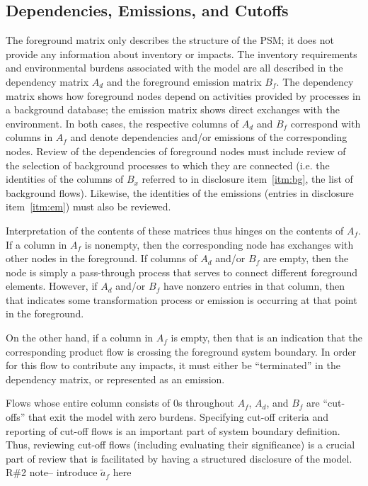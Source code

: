 \subsection{Dependencies, Emissions, and Cutoffs}

The foreground matrix only describes the structure of the PSM; it does not provide any information about inventory or impacts.  The inventory requirements and environmental burdens associated with the model are all described in the dependency matrix $A_d$ and the foreground emission matrix $B_f$.  The dependency matrix shows how foreground nodes depend on activities provided by processes in a background database; the emission matrix shows direct exchanges with the environment.  In both cases, the respective columns of $A_d$ and $B_f$ correspond with columns in $A_f$ and denote dependencies and/or emissions of the corresponding nodes.  Review of the dependencies of foreground nodes must include review of the selection of background processes to which they are connected (i.e. the identities of the columns of $B_x$ referred to in disclosure item~\ref{itm:bg}, the list of background flows). Likewise, the identities of the emissions (entries in disclosure item~\ref{itm:em}) must also be reviewed.

Interpretation of the contents of these matrices thus hinges on the contents of $A_f$.  If a column in $A_f$ is nonempty, then the corresponding node has exchanges with other nodes in the foreground.  If columns of $A_d$ and/or $B_f$ are empty, then the node is simply a pass-through process that serves to connect different foreground elements.  However, if $A_d$ and/or $B_f$ have nonzero entries in that column, then that indicates some transformation process or emission is occurring at that point in the foreground.  

On the other hand, if a column in $A_f$ is empty, then that is an indication that the corresponding product flow is crossing the foreground system boundary.  In order for this flow to contribute any impacts, it must either be ``terminated'' in the dependency matrix, or represented as an emission.  

Flows whose entire column consists of 0s throughout $A_f$, $A_d$, and $B_f$ are ``cut-offs'' that exit the model with zero burdens.  Specifying cut-off criteria and reporting of cut-off flows is an important part of system boundary definition.  Thus, reviewing cut-off flows (including evaluating their significance) is a crucial part of review that is facilitated by having a structured disclosure of the model.
{\red R\#2 note-- introduce $\tilde{a}_f$ here}
